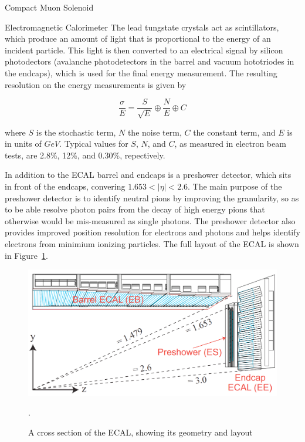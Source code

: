 \begin{section}{Compact Muon Solenoid}
\begin{subsection}{Electromagnetic Calorimeter}
The lead tungstate crystals act as scintillators, which produce an amount of light that is proportional to the energy of an incident particle.
This light is then converted to an electrical signal by silicon photodectors (avalanche photodetectors in the barrel and vacuum hototriodes in the endcaps), which is used for the final energy measurement.
The resulting resolution on the energy measurements is given by 

\begin{equation}
\label{eq:ecal_resolution}
\frac{\sigma}{E} = \frac{S}{\sqrt{E}} \oplus \frac{N}{E} \oplus C
\end{equation}

where $S$ is the stochastic term, $N$ the noise term, $C$ the constant term, and $E$ is in units of $GeV$.
Typical values for $S$, $N$, and $C$, as measured in electron beam tests, are 2.8\%, 12\%, and 0.30\%, repectively.

In addition to the ECAL barrel and endcaps is a preshower detector, which sits in front of the endcaps, convering $1.653<|\eta|<2.6$.
The main purpose of the preshower detector is to identify neutral pions by improving the granularity, so as to be able resolve photon pairs from the decay of high energy pions that otherwise would be mis-measured as single photons. 
The preshower detector also provides improved position resolution for electrons and photons and helps identify electrons from minimium ionizing particles.
The full layout of the ECAL is shown in Figure~\ref{fig:cms_ecal}.

\begin{figure}[tbp!]
\begin{center}
\includegraphics[angle=0,width=0.80\columnwidth]{fig/cms_ecal.png}
\end{center}
\caption{A cross section of the ECAL, showing its geometry and layout}.
\label{fig:cms_ecal}
\end{figure}

\end{subsection}


\end{section}
